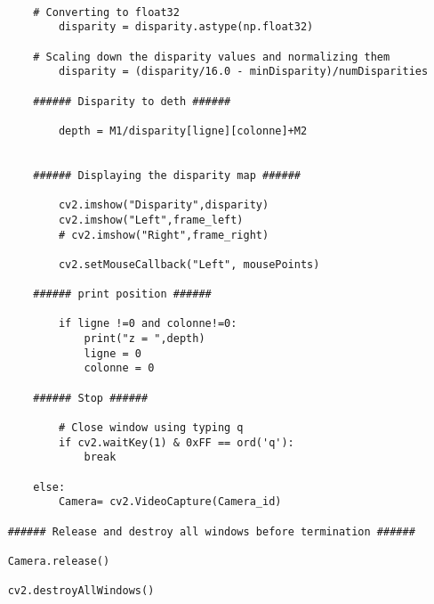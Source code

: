 \begin{verbatim}
    
    	# Converting to float32 
            disparity = disparity.astype(np.float32)
    
    	# Scaling down the disparity values and normalizing them 
            disparity = (disparity/16.0 - minDisparity)/numDisparities
    
        ###### Disparity to deth ######
    
            depth = M1/disparity[ligne][colonne]+M2
    
    
        ###### Displaying the disparity map ######
    
            cv2.imshow("Disparity",disparity)
            cv2.imshow("Left",frame_left)
            # cv2.imshow("Right",frame_right)
            
            cv2.setMouseCallback("Left", mousePoints)
    
        ###### print position ######
    
            if ligne !=0 and colonne!=0:
                print("z = ",depth)
                ligne = 0
                colonne = 0
    
        ###### Stop ######
    
            # Close window using typing q
            if cv2.waitKey(1) & 0xFF == ord('q'):
                break
                
        else:
            Camera= cv2.VideoCapture(Camera_id)
    
    ###### Release and destroy all windows before termination ######
    
    Camera.release()
    
    cv2.destroyAllWindows()
\end{verbatim}